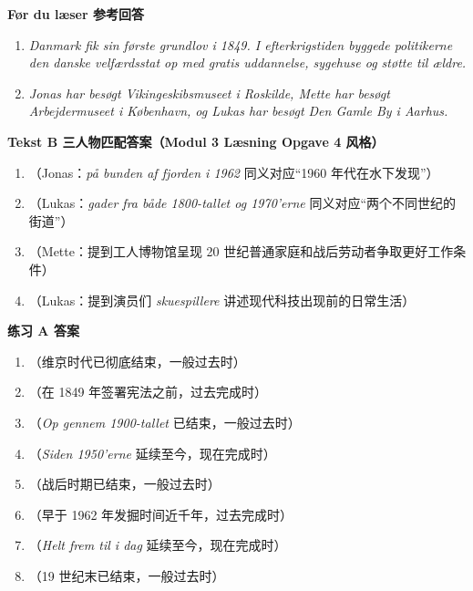 \begin{answerbox}
\textbf{Før du læser 参考回答}
\begin{enumerate}
  \item \textit{Danmark fik sin første grundlov i 1849. I efterkrigstiden byggede politikerne den danske velfærdsstat op med gratis uddannelse, sygehuse og støtte til ældre.}
  \item \textit{Jonas har besøgt Vikingeskibsmuseet i Roskilde, Mette har besøgt Arbejdermuseet i København, og Lukas har besøgt Den Gamle By i Aarhus.}
\end{enumerate}

\textbf{Tekst B 三人物匹配答案（Modul 3 Læsning Opgave 4 风格）}
\begin{enumerate}
  \item {}（Jonas：\textit{på bunden af fjorden i 1962} 同义对应“1960 年代在水下发现”）
  \item {}（Lukas：\textit{gader fra både 1800-tallet og 1970'erne} 同义对应“两个不同世纪的街道”）
  \item {}（Mette：提到工人博物馆呈现 20 世纪普通家庭和战后劳动者争取更好工作条件）
  \item {}（Lukas：提到演员们 \textit{skuespillere} 讲述现代科技出现前的日常生活）
\end{enumerate}

\textbf{练习 A 答案}
\begin{enumerate}
  \item {}（维京时代已彻底结束，一般过去时）
  \item {}（在 1849 年签署宪法之前，过去完成时）
  \item {}（\textit{Op gennem 1900-tallet} 已结束，一般过去时）
  \item {}（\textit{Siden 1950'erne} 延续至今，现在完成时）
  \item {}（战后时期已结束，一般过去时）
  \item {}（早于 1962 年发掘时间近千年，过去完成时）
  \item {}（\textit{Helt frem til i dag} 延续至今，现在完成时）
  \item {}（19 世纪末已结束，一般过去时）
\end{enumerate}


\end{answerbox}
